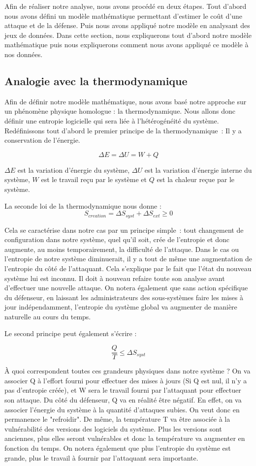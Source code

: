 
Afin de réaliser notre analyse, nous avons procédé en deux étapes.
Tout d'abord nous avons défini un modèle mathématique permettant d'estimer le coût d'une attaque et de la défense.
Puis nous avons appliqué notre modèle en analysant des jeux de données.
Dans cette section, nous expliquerons tout d'abord notre modèle mathématique puis nous expliquerons comment nous avons appliqué ce modèle à nos données.


\subsection{Analogie avec la thermodynamique}

Afin de définir notre modèle mathématique, nous avons basé notre approche sur un phénomène physique homologue : la thermodynamique.
Nous allons donc définir une entropie logicielle qui sera liée à l'hétérogénéité du système.
Redéfinissons tout d'abord le premier principe de la thermodynamique~: Il y a conservation de l'énergie. 

\[
\Delta E = \Delta U = W + Q
\]

$\Delta E$ est la variation d'énergie du système, $\Delta U$ est la variation d'énergie interne du système, $W$ est le travail reçu par le système et $Q$ est la chaleur reçue par le système.

La seconde loi de la thermodynamique nous donne :
\[
S_{creation} = \Delta S_{syst} + \Delta S_{ext} \geq 0
\]

Cela se caractérise dans notre cas par un principe simple~: tout changement de configuration dans notre système, quel qu'il soit, crée de l'entropie et donc augmente, au moins temporairement, la difficulté de l'attaque.
Dans le cas ou l'entropie de notre système diminuerait, il y a tout de même une augmentation de l'entropie du côté de l'attaquant. Cela s'explique par le fait que l'état du nouveau système lui est inconnu. Il doit à nouveau refaire toute son analyse avant d'effectuer une nouvelle attaque. On notera également que sans action spécifique du défenseur, en laissant les administrateurs des sous-systèmes faire les mises à jour indépendamment, l'entropie du système global va augmenter de manière naturelle au cours du temps. 

Le second principe peut également s'écrire :

\[
\frac{Q}{T} \leq \Delta S_{syst}
\]

À quoi correspondent toutes ces grandeurs physiques dans notre système ? On va associer Q à l'effort fourni pour effectuer des mises à jours (Si Q est nul, il n'y a pas d'entropie créée), et W sera le travail fourni par l'attaquant pour effectuer son attaque. Du côté du défenseur, Q va en réalité être négatif. En effet, on va associer l'énergie du système à la quantité d'attaques subies. On veut donc en permanence le "refroidir".
De même, la température T va être associée à la vulnérabilité des versions des logiciels du système. Plus les versions sont anciennes, plus elles seront vulnérables et donc la température va augmenter en fonction du temps.
On notera également que plus l'entropie du système est grande, plus le travail à fournir par l'attaquant sera importante.

